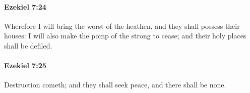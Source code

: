 		\paragraph{Ezekiel 7:24} %
			\label{EZEKIEL-7-24}

			Wherefore I will bring the worst of the heathen, and they shall possess their houses: I will also make the pomp of the strong to cease; and their holy places shall be defiled.


		\paragraph{Ezekiel 7:25} %
			\label{EZEKIEL-7-25}

			Destruction cometh; and they shall seek peace, and there shall be none.


